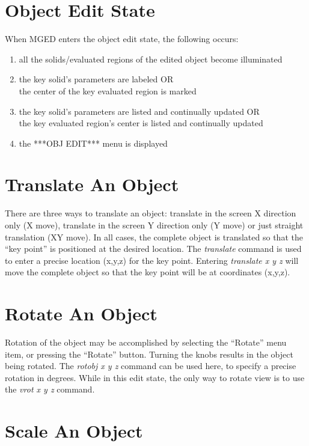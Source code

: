 \section{Object Edit State}

When MGED enters the object edit state, the following occurs:

\begin{enumerate}
\item all the solids/evaluated regions of the edited object
become illuminated
\item the key solid's parameters are labeled  OR \\
the center of the key evaluated region is marked
\item the key solid's parameters are listed and
continually updated  OR \\
the key evaluated region's center is listed and
continually updated
\item the ***OBJ EDIT*** menu is displayed
\end{enumerate}

\section{Translate An Object}

There are three ways to translate an object:  translate in the screen
X direction only (X move), translate in the screen Y direction only
(Y move) or just straight translation (XY move).
In all cases, the complete object is translated so that the ``key point''
is positioned at the desired location.
The {\em translate} command is used to enter a precise location (x,y,z) for
the key point.
Entering {\em translate x y z} will move the complete object so that the key
point will be at coordinates (x,y,z).

\section{Rotate An Object}

Rotation of the object may be accomplished by selecting the ``Rotate''
menu item, or pressing the ``Rotate'' button.
Turning the knobs results in the object being rotated.
The {\em rotobj x y z} command can be used here, to specify
a precise rotation in degrees.
While in this edit state, the only way to rotate view is to use
the {\em vrot x y z} command.

\section{Scale An Object}
